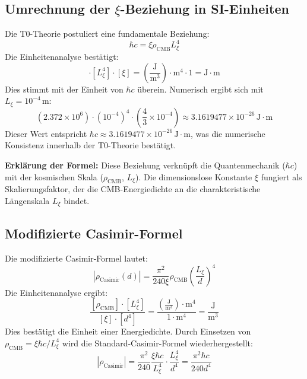 \documentclass{article}
\begin{document}
	\subsection{Umrechnung der $\xi$-Beziehung in SI-Einheiten}
	Die T0-Theorie postuliert eine fundamentale Beziehung:
	\begin{equation}
		\hbar c = \xi \rho_{\text{CMB}} L_\xi^4
	\end{equation}
	Die Einheitenanalyse bestätigt:
	\begin{equation}
		[\rho_{\text{CMB}}] \cdot [L_\xi^4] \cdot [\xi] = \left( \frac{\text{J}}{\text{m}^3} \right) \cdot \text{m}^4 \cdot 1 = \text{J} \cdot \text{m}
	\end{equation}
	Dies stimmt mit der Einheit von $\hbar c$ überein. Numerisch ergibt sich mit $L_\xi = 10^{-4} \, \text{m}$:
	\begin{equation}
		\left( 2.372 \times 10^6 \right) \cdot \left( 10^{-4} \right)^4 \cdot \left( \frac{4}{3} \times 10^{-4} \right) \approx 3.1619477 \times 10^{-26} \, \text{J} \cdot \text{m}
	\end{equation}
	Dieser Wert entspricht $\hbar c \approx 3.1619477 \times 10^{-26} \, \text{J} \cdot \text{m}$, was die numerische Konsistenz innerhalb der T0-Theorie bestätigt.
	
	\textbf{Erklärung der Formel:} Diese Beziehung verknüpft die Quantenmechanik ($\hbar c$) mit der kosmischen Skala ($\rho_{\text{CMB}}$, $L_\xi$). Die dimensionslose Konstante $\xi$ fungiert als Skalierungsfaktor, der die CMB-Energiedichte an die charakteristische Längenskala $L_\xi$ bindet.
	
	\subsection{Modifizierte Casimir-Formel}
	Die modifizierte Casimir-Formel lautet:
	\begin{equation}
		|\rho_{\text{Casimir}}(d)| = \frac{\pi^2}{240 \xi} \rho_{\text{CMB}} \left( \frac{L_\xi}{d} \right)^4
	\end{equation}
	Die Einheitenanalyse ergibt:
	\begin{equation}
		\frac{[\rho_{\text{CMB}}] \cdot [L_\xi^4]}{[\xi] \cdot [d^4]} = \frac{\left( \frac{\text{J}}{\text{m}^3} \right) \cdot \text{m}^4}{1 \cdot \text{m}^4} = \frac{\text{J}}{\text{m}^3}
	\end{equation}
	Dies bestätigt die Einheit einer Energiedichte. Durch Einsetzen von $\rho_{\text{CMB}} = \xi \hbar c / L_\xi^4$ wird die Standard-Casimir-Formel wiederhergestellt:
	\begin{equation}
		|\rho_{\text{Casimir}}| = \frac{\pi^2}{240} \frac{\xi \hbar c}{L_\xi^4} \cdot \frac{L_\xi^4}{d^4} = \frac{\pi^2 \hbar c}{240 d^4}
	\end{equation}
	
\end{document}

